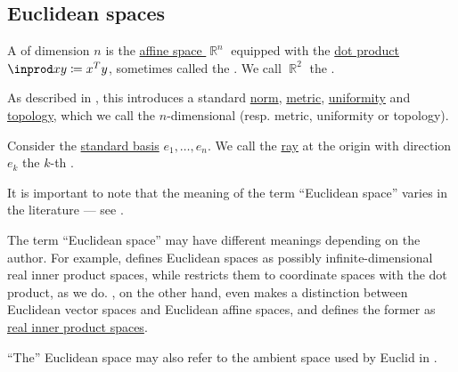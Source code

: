 \subsection{Euclidean spaces}\label{subsec:euclidean_spaces}

\begin{definition}\label{def:euclidean_space}\mimprovised
  A  of dimension \( n \) is the \hyperref[def:affine_space]{affine space \( \BbbR^n \)} equipped with the \hyperref[def:inner_product_space]{dot product} \( \inprod x y \coloneqq x^T y \), sometimes called the . We call \( \BbbR^2 \) the .

  As described in , this introduces a standard \hyperref[def:norm]{norm}, \hyperref[def:metric_space]{metric}, \hyperref[def:uniform_space]{uniformity} and \hyperref[def:topological_space]{topology}, which we call the \( n \)-dimensional  (resp. metric, uniformity or topology).

  Consider the \hyperref[def:sequence_space]{standard basis} \( e_1, \ldots, e_n \). We call the \hyperref[def:geometric_ray]{ray} at the origin with direction \( e_k \) the \( k \)-th .

  It is important to note that the meaning of the term \enquote{Euclidean space} varies in the literature --- see .
\end{definition}

\begin{remark}\label{rem:euclidean_space_etymology}
  The term \enquote{Euclidean space} may have different meanings depending on the author. For example, \cite[sec. 24.1]{Тыртышников2007ЛинАлгебра} defines Euclidean spaces as possibly infinite-dimensional real inner product spaces, while \cite[2.19]{Rudin1987RealAndComplexAnalysis} restricts them to coordinate spaces with the dot product, as we do. , on the other hand, even makes a distinction between Euclidean vector spaces and Euclidean affine spaces, and defines the former as \hyperref[def:inner_product_space]{real inner product spaces}.

  \enquote{The} Euclidean space may also refer to the ambient space used by Euclid in \cite{Fitzpatrick2007EuclidsElements}.
\end{remark}

